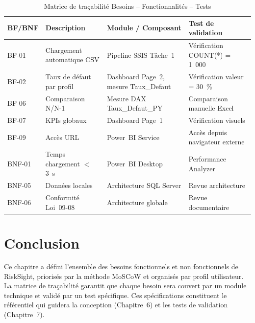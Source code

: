 \documentclass[12pt, a4paper]{report}
\begin{document}
\begin{table}[H]
\centering
\caption{Matrice de traçabilité Besoins -- Fonctionnalités -- Tests}
\label{tab:tracabilite}
\renewcommand{\arraystretch}{1.8}
\begin{tabularx}{\textwidth}{p{1.5cm} X p{4cm} p{4cm}}
\toprule
\rowcolor{primary!12}
BF/BNF & Description & Module / Composant & Test de validation \\
\midrule
BF-01 & Chargement \newline automatique CSV & Pipeline SSIS Tâche~1 & Vérification COUNT(*) = 1~000 \\
BF-02 & Taux de défaut par \newline profil & Dashboard Page~2, mesure Taux\_Defaut & Vérification valeur = 30~\% \\
BF-06 & Comparaison N/N-1 & Mesure DAX Taux\_Defaut\_PY & Comparaison manuelle Excel \\
BF-07 & KPIs globaux & Dashboard Page~1 & Vérification visuels \\
BF-09 & Accès URL & Power~BI Service & Accès depuis navigateur externe \\
BNF-01 & Temps chargement $<$3~s & Power~BI Desktop & Performance Analyzer \\
BNF-05 & Données locales & Architecture SQL Server & Revue architecture \\
BNF-06 & Conformité Loi~09-08 & Architecture globale & Revue documentaire~\cite{loi0908} \\
\bottomrule
\end{tabularx}
\end{table}

\section{Conclusion}

Ce chapitre a défini l'ensemble des besoins fonctionnels et non fonctionnels de
RiskSight, priorisés par la méthode MoSCoW et organisés par profil utilisateur.
La matrice de traçabilité garantit que chaque besoin sera couvert par un module
technique et validé par un test spécifique. Ces spécifications constituent le
référentiel qui guidera la conception (Chapitre~6) et les tests de validation
(Chapitre~7).






%
\end{document}
